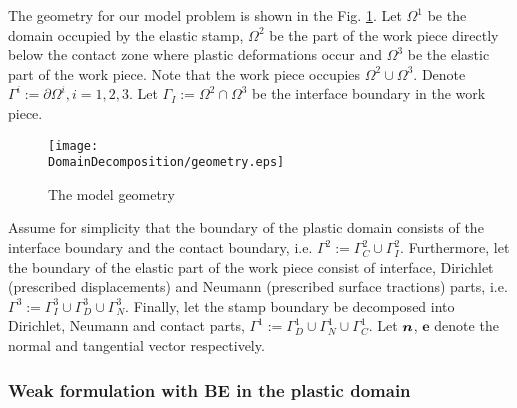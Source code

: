 \documentclass[12pt,a4paper]{scrbook}
\begin{document}
The geometry for our model problem is shown in the Fig. \ref{fig:scheme}. Let $\Omega^1$ be the domain occupied by the elastic stamp, $\Omega^2$ be the part of the work piece directly below the contact zone where plastic deformations occur and $\Omega^3$ be the elastic part of the work piece. Note that the work piece occupies $\Omega^2 \cup \Omega^3$. Denote $\Gamma^i := \partial \Omega^i, i=1,2,3$. Let $\Gamma_I:=\Omega^2 \cap \Omega^3$ be the interface boundary in the work piece.
\begin{figure}[h!]
\begin{minipage}[c]{15cm}
\begin{center}
     \texttt{[image: \\DomainDecomposition/geometry.eps]}
\caption{ \label{fig:scheme} The model geometry}
\end{center}
\end{minipage}
\end{figure}

Assume for simplicity that the boundary of the plastic domain consists of the interface boundary and the contact boundary, i.e. $  \Gamma^2 := \Gamma^2_C \cup  \Gamma^2_I $. Furthermore, let the boundary of the elastic part of the work piece consist of interface, Dirichlet (prescribed displacements) and Neumann (prescribed surface tractions) parts, i.e. $  \Gamma^3 := \Gamma^3_I \cup  \Gamma^3_D \cup  \Gamma^3_N$. Finally, let the stamp boundary be decomposed into Dirichlet, Neumann and contact parts, $ \Gamma^1 :=  \Gamma^1_D \cup  \Gamma^1_N \cup  \Gamma^1_C $. Let $\mbox{\boldmath$n$}$, $\mathbf{e}$ denote the normal and tangential vector respectively.

\subsubsection{Weak formulation with BE in the plastic domain}
\end{document}

